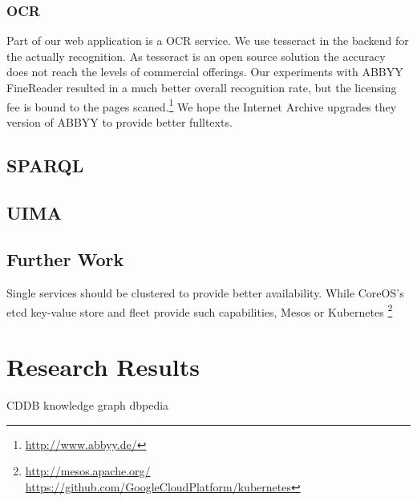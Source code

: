 \documentclass[12pt, draft]{article}
\begin{document}
\subsubsection{OCR}

Part of our web application is a OCR service.  We use tesseract in the backend for the
actually recognition.  As tesseract is an open source solution the accuracy does not
reach the levels of commercial offerings.  Our experiments with ABBYY FineReader
resulted in a much better overall recognition rate, but the licensing fee is bound
to the pages scaned.\footnote{\url{http://www.abbyy.de/}}
We hope the Internet Archive upgrades they version of ABBYY to provide better fulltexts.

\subsection{SPARQL}

\subsection{UIMA}

\subsection{Further Work}

Single services should be clustered to provide better availability. While CoreOS's etcd key-value store
and fleet provide such capabilities, Mesos or Kubernetes
\footnote{\url{http://mesos.apache.org/} \url{https://github.com/GoogleCloudPlatform/kubernetes}}


\section{Research Results}

CDDB
knowledge graph
dbpedia
\end{document}
